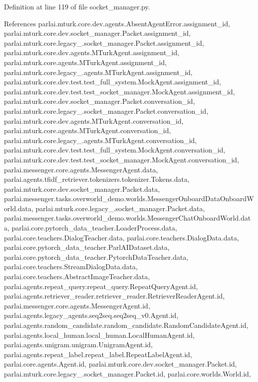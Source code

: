 Definition at line 119 of file socket\+\_\+manager.\+py.



References parlai.\+mturk.\+core.\+dev.\+agents.\+Absent\+Agent\+Error.\+assignment\+\_\+id, parlai.\+mturk.\+core.\+dev.\+socket\+\_\+manager.\+Packet.\+assignment\+\_\+id, parlai.\+mturk.\+core.\+legacy\+\_.\+socket\+\_\+manager.\+Packet.\+assignment\+\_\+id, parlai.\+mturk.\+core.\+dev.\+agents.\+M\+Turk\+Agent.\+assignment\+\_\+id, parlai.\+mturk.\+core.\+agents.\+M\+Turk\+Agent.\+assignment\+\_\+id, parlai.\+mturk.\+core.\+legacy\+\_.\+agents.\+M\+Turk\+Agent.\+assignment\+\_\+id, parlai.\+mturk.\+core.\+dev.\+test.\+test\+\_\+full\+\_\+system.\+Mock\+Agent.\+assignment\+\_\+id, parlai.\+mturk.\+core.\+dev.\+test.\+test\+\_\+socket\+\_\+manager.\+Mock\+Agent.\+assignment\+\_\+id, parlai.\+mturk.\+core.\+dev.\+socket\+\_\+manager.\+Packet.\+conversation\+\_\+id, parlai.\+mturk.\+core.\+legacy\+\_.\+socket\+\_\+manager.\+Packet.\+conversation\+\_\+id, parlai.\+mturk.\+core.\+dev.\+agents.\+M\+Turk\+Agent.\+conversation\+\_\+id, parlai.\+mturk.\+core.\+agents.\+M\+Turk\+Agent.\+conversation\+\_\+id, parlai.\+mturk.\+core.\+legacy\+\_.\+agents.\+M\+Turk\+Agent.\+conversation\+\_\+id, parlai.\+mturk.\+core.\+dev.\+test.\+test\+\_\+full\+\_\+system.\+Mock\+Agent.\+conversation\+\_\+id, parlai.\+mturk.\+core.\+dev.\+test.\+test\+\_\+socket\+\_\+manager.\+Mock\+Agent.\+conversation\+\_\+id, parlai.\+messenger.\+core.\+agents.\+Messenger\+Agent.\+data, parlai.\+agents.\+tfidf\+\_\+retriever.\+tokenizers.\+tokenizer.\+Tokens.\+data, parlai.\+mturk.\+core.\+dev.\+socket\+\_\+manager.\+Packet.\+data, parlai.\+messenger.\+tasks.\+overworld\+\_\+demo.\+worlds.\+Messenger\+Onboard\+Data\+Onboard\+World.\+data, parlai.\+mturk.\+core.\+legacy\+\_.\+socket\+\_\+manager.\+Packet.\+data, parlai.\+messenger.\+tasks.\+overworld\+\_\+demo.\+worlds.\+Messenger\+Chat\+Onboard\+World.\+data, parlai.\+core.\+pytorch\+\_\+data\+\_\+teacher.\+Loader\+Process.\+data, parlai.\+core.\+teachers.\+Dialog\+Teacher.\+data, parlai.\+core.\+teachers.\+Dialog\+Data.\+data, parlai.\+core.\+pytorch\+\_\+data\+\_\+teacher.\+Parl\+A\+I\+Dataset.\+data, parlai.\+core.\+pytorch\+\_\+data\+\_\+teacher.\+Pytorch\+Data\+Teacher.\+data, parlai.\+core.\+teachers.\+Stream\+Dialog\+Data.\+data, parlai.\+core.\+teachers.\+Abstract\+Image\+Teacher.\+data, parlai.\+agents.\+repeat\+\_\+query.\+repeat\+\_\+query.\+Repeat\+Query\+Agent.\+id, parlai.\+agents.\+retriever\+\_\+reader.\+retriever\+\_\+reader.\+Retriever\+Reader\+Agent.\+id, parlai.\+messenger.\+core.\+agents.\+Messenger\+Agent.\+id, parlai.\+agents.\+legacy\+\_\+agents.\+seq2seq.\+seq2seq\+\_\+v0.\+Agent.\+id, parlai.\+agents.\+random\+\_\+candidate.\+random\+\_\+candidate.\+Random\+Candidate\+Agent.\+id, parlai.\+agents.\+local\+\_\+human.\+local\+\_\+human.\+Local\+Human\+Agent.\+id, parlai.\+agents.\+unigram.\+unigram.\+Unigram\+Agent.\+id, parlai.\+agents.\+repeat\+\_\+label.\+repeat\+\_\+label.\+Repeat\+Label\+Agent.\+id, parlai.\+core.\+agents.\+Agent.\+id, parlai.\+mturk.\+core.\+dev.\+socket\+\_\+manager.\+Packet.\+id, parlai.\+mturk.\+core.\+legacy\+\_.\+socket\+\_\+manager.\+Packet.\+id, parlai.\+core.\+worlds.\+World.\+id, 